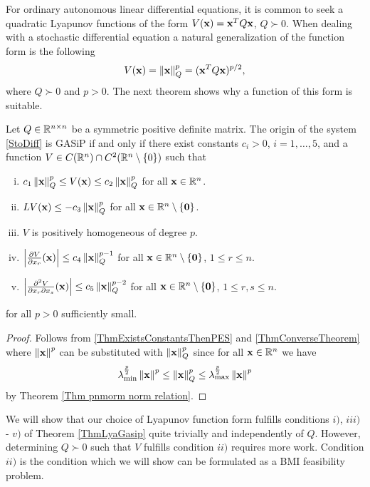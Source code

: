 \documentclass[a4paper,12pt,twoside,BCOR=10mm]{scrbook}
\begin{document}
For ordinary autonomous linear differential equations, it is common to seek a quadratic Lyapunov functions of the form $V(\mathbf{x}) = \mathbf{x}^T Q\mathbf{x}$, $Q \succ 0$. When dealing with a stochastic differential equation a natural generalization of the function form is the following
\begin{align}\label{LyaForm}
    V(\mathbf{x}) = \left\lVert\mathbf{x}\right\rVert_Q^p = (\mathbf{x}^T Q \mathbf{x})^{p / 2},
\end{align}
where $Q \succ 0$ and $p > 0$. The next theorem shows why a function of this form is suitable.

\begin{theorem}\label{ThmLyaGasip}
Let $Q\in \mathbb{R}^{n\times n}$ be a symmetric positive definite matrix. The origin of the system \eqref{StoDiff} is  GASiP if and only if there exist constants $c_i > 0$, $i = 1,\ldots, 5$, and a function $V \in C(\mathbb{R}^{n}) \cap C^2(\mathbb{R}^{n} \setminus \{0\})$ such that
\begin{enumerate}[i)]
    \item $c_1 \left\lVert\mathbf{x}\right\rVert_Q^p \leq V(\mathbf{x}) \leq c_2 \left\lVert\mathbf{x}\right\rVert_Q^p$ for all $\mathbf{x} \in \mathbb{R}^{n}$.
    \item $LV(\mathbf{x}) \leq -c_3\left\lVert\mathbf{x}\right\rVert_Q^p$ for all $\mathbf{x} \in \mathbb{R}^{n} \setminus \{\mathbf{0}\}$.
    \item $V$ is positively homogeneous of degree $p$.
    \item $\left\lvert \frac{\partial V}{\partial x_r}(\mathbf{x})\right\rvert \leq c_4 \left\lVert\mathbf{x}\right\rVert_{Q}^{p-1}$ for all $\mathbf{x} \in \mathbb{R}^{n} \setminus \{\mathbf{0}\}$, $1 \leq r \leq n$.
    \item $\left\lvert \frac{\partial ^2 V}{\partial x_r \partial x_s}(\mathbf{x}) \right\rvert \leq c_5 \left\lVert\mathbf{x}\right\rVert_{Q}^{p-2}$ for all $\mathbf{x} \in \mathbb{R}^{n} \setminus \{\mathbf{0}\}$, $1 \leq r,s \leq n$.
\end{enumerate}
for all $p > 0$ sufficiently small. 
\end{theorem}
\begin{proof}
Follows from \ref{ThmExistsConstantsThenPES} and \ref{ThmConverseTheorem} where $\left\lVert\mathbf{x}\right\rVert^p$ can be substituted with $\left\lVert\mathbf{x}\right\rVert_Q^p$ since for all $\mathbf{x} \in \mathbb{R}^{n}$ we have
\begin{align*}
    \lambda_{\min}^\frac{p}{2}\left\lVert\mathbf{x}\right\rVert^p \leq \left\lVert\mathbf{x}\right\rVert_Q^p \leq \lambda_{\max}^\frac{p}{2}\left\lVert\mathbf{x}\right\rVert^p
\end{align*}
by Theorem \ref{Thm pnmorm norm relation}.
\end{proof}

We will show that our choice of Lyapunov function form fulfills conditions $i)$, $iii)$ - $v)$ of Theorem \ref{ThmLyaGasip} quite trivially and independently of $Q$. However, determining $Q \succ 0$ such that $V$ fulfills condition $ii)$ requires more work. Condition $ii)$ is the condition which we will show can be formulated as a BMI feasibility problem.
\end{document}
